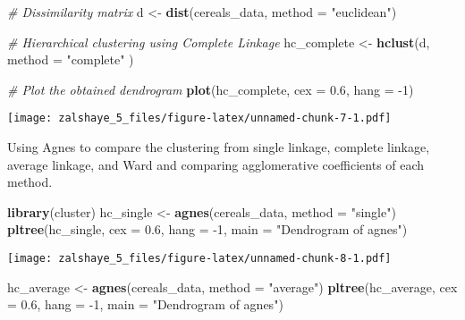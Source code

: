 \documentclass[
]{article}
\newenvironment{Shaded}{\begin{snugshade}}{\end{snugshade}}
\newcommand{\CommentTok}[1]{\textcolor[rgb]{0.56,0.35,0.01}{\textit{#1}}}
\newcommand{\DataTypeTok}[1]{\textcolor[rgb]{0.13,0.29,0.53}{#1}}
\newcommand{\DecValTok}[1]{\textcolor[rgb]{0.00,0.00,0.81}{#1}}
\newcommand{\FloatTok}[1]{\textcolor[rgb]{0.00,0.00,0.81}{#1}}
\newcommand{\KeywordTok}[1]{\textcolor[rgb]{0.13,0.29,0.53}{\textbf{#1}}}
\newcommand{\NormalTok}[1]{#1}
\newcommand{\StringTok}[1]{\textcolor[rgb]{0.31,0.60,0.02}{#1}}
\begin{document}
\begin{Shaded}
\begin{Highlighting}[]
\CommentTok{# Dissimilarity matrix}
\NormalTok{d <-}\StringTok{ }\KeywordTok{dist}\NormalTok{(cereals_data, }\DataTypeTok{method =} \StringTok{"euclidean"}\NormalTok{)}

\CommentTok{# Hierarchical clustering using Complete Linkage}
\NormalTok{hc_complete <-}\StringTok{ }\KeywordTok{hclust}\NormalTok{(d, }\DataTypeTok{method =} \StringTok{"complete"}\NormalTok{ )}

\CommentTok{# Plot the obtained dendrogram}
\KeywordTok{plot}\NormalTok{(hc_complete, }\DataTypeTok{cex =} \FloatTok{0.6}\NormalTok{, }\DataTypeTok{hang =} \DecValTok{-1}\NormalTok{)}
\end{Highlighting}
\end{Shaded}

\texttt{[image: zalshaye\_5\_files/figure-latex/unnamed-chunk-7-1.pdf]}

Using Agnes to compare the clustering from single linkage, complete
linkage, average linkage, and Ward and comparing agglomerative
coefficients of each method.

\begin{Shaded}
\begin{Highlighting}[]
\KeywordTok{library}\NormalTok{(cluster)}
\NormalTok{hc_single <-}\StringTok{ }\KeywordTok{agnes}\NormalTok{(cereals_data, }\DataTypeTok{method =} \StringTok{"single"}\NormalTok{)}
\KeywordTok{pltree}\NormalTok{(hc_single, }\DataTypeTok{cex =} \FloatTok{0.6}\NormalTok{, }\DataTypeTok{hang =} \DecValTok{-1}\NormalTok{, }\DataTypeTok{main =} \StringTok{"Dendrogram of agnes"}\NormalTok{)}
\end{Highlighting}
\end{Shaded}

\texttt{[image: zalshaye\_5\_files/figure-latex/unnamed-chunk-8-1.pdf]}

\begin{Shaded}
\begin{Highlighting}[]
\NormalTok{hc_average <-}\StringTok{ }\KeywordTok{agnes}\NormalTok{(cereals_data, }\DataTypeTok{method =} \StringTok{"average"}\NormalTok{)}
\KeywordTok{pltree}\NormalTok{(hc_average, }\DataTypeTok{cex =} \FloatTok{0.6}\NormalTok{, }\DataTypeTok{hang =} \DecValTok{-1}\NormalTok{, }\DataTypeTok{main =} \StringTok{"Dendrogram of agnes"}\NormalTok{)}
\end{Highlighting}
\end{Shaded}
\end{document}
